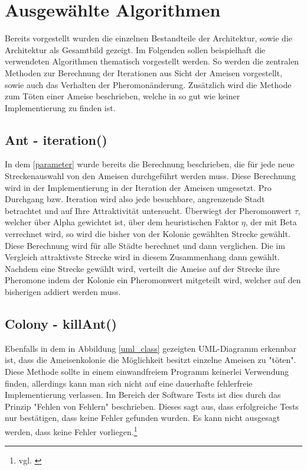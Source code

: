 \section{Ausgewählte Algorithmen}{
\label{algorithms}
	Bereits vorgestellt wurden die einzelnen Bestandteile der Architektur, sowie die Architektur als Gesamtbild gezeigt. Im Folgenden sollen beispielhaft die verwendeten Algorithmen thematisch vorgestellt werden. So werden die zentralen Methoden zur Berechnung der Iterationen aus Sicht der Ameisen vorgestellt, sowie auch das Verhalten der Pheromonänderung. Zusätzlich wird die Methode zum Töten einer Ameise beschrieben, welche in so gut wie keiner Implementierung zu finden ist.
	
	\subsection{Ant - iteration()}
	In dem \ref{parameter} wurde bereits die Berechnung beschrieben, die für jede neue Streckenauswahl von den Ameisen durchgeführt werden muss. Diese Berechnung wird in der Implementierung in der Iteration der Ameisen umgesetzt. Pro Durchgang bzw. Iteration wird also jede besuchbare, angrenzende Stadt betrachtet und auf Ihre Attraktivität untersucht. Überwiegt der Pheromonwert $\tau$, welcher über Alpha gewichtet ist, über dem heuristischen Faktor $\eta$, der mit Beta verrechnet wird, so wird die bisher von der Kolonie gewählten Strecke gewählt. Diese Berechnung wird für alle Städte berechnet und dann verglichen. Die im Vergleich attraktivste Strecke wird in diesem Zusammenhang dann gewählt.
	Nachdem eine Strecke gewählt wird, verteilt die Ameise auf der Strecke ihre Pheromone indem der Kolonie ein Pheromonwert mitgeteilt wird, welcher auf den bisherigen addiert werden muss.
	
	\subsection{Colony - killAnt()}
	Ebenfalls in dem in Abbildung \ref{uml_class} gezeigten UML-Diagramm erkennbar ist, dass die Ameisenkolonie die Möglichkeit besitzt einzelne Ameisen zu "töten". 
	Diese Methode sollte in einem einwandfreiem Programm keinerlei Verwendung finden, allerdings kann man sich nicht auf eine dauerhafte fehlerfreie Implementierung verlassen. Im Bereich der Software Tests ist dies durch das Prinzip "Fehlen von Fehlern" beschrieben. Dieses sagt aus, dass erfolgreiche Tests nur bestätigen, dass keine Fehler gefunden wurden. Es kann nicht ausgesagt werden, dass keine Fehler vorliegen.\footnote{vgl. \cite{bibid}}
	
}
